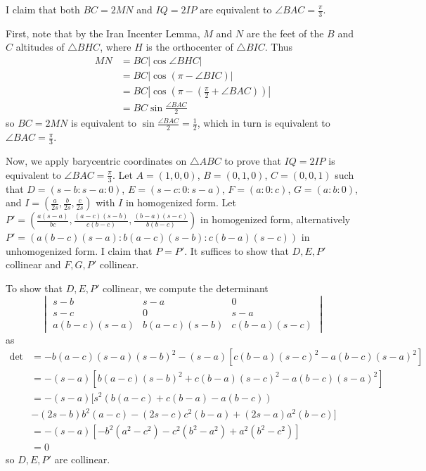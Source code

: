 I claim that both $BC=2MN$ and $IQ=2IP$ are equivalent to $\angle{BAC}=\frac{\pi}{3}$.

First, note that by the Iran Incenter Lemma, $M$ and $N$ are the feet of the $B$ and $C$ altitudes of $\triangle{BHC}$, where $H$ is the orthocenter of $\triangle{BIC}$. Thus
\begin{align*}
	MN&=BC\left|\cos\angle{BHC}\right|\\
	&=BC\left|\cos\left(\pi-\angle{BIC}\right)\right|\\
	&=BC\left|\cos\left(\pi-\left(\frac{\pi}{2}+\angle{BAC}\right)\right)\right|\\
	&=BC\sin\frac{\angle{BAC}}{2}
\end{align*}
so $BC=2MN$ is equivalent to $\sin\frac{\angle{BAC}}{2}=\frac{1}{2}$, which in turn is equivalent to $\angle{BAC}=\frac{\pi}{3}$.

Now, we apply barycentric coordinates on $\triangle{ABC}$ to prove that $IQ=2IP$ is equivalent to $\angle{BAC}=\frac{\pi}{3}$. Let $A=\left(1,0,0\right)$, $B=\left(0,1,0\right)$, $C=\left(0,0,1\right)$ such that $D=\left(s-b:s-a:0\right)$, $E=\left(s-c:0:s-a\right)$, $F=\left(a:0:c\right)$, $G=\left(a:b:0\right)$, and $I=\left(\frac{a}{2s},\frac{b}{2s},\frac{c}{2s}\right)$ with $I$ in homogenized form. Let $P'=\left(\frac{a\left(s-a\right)}{bc},\frac{\left(a-c\right)\left(s-b\right)}{c\left(b-c\right)},\frac{\left(b-a\right)\left(s-c\right)}{b\left(b-c\right)}\right)$ in homogenized form, alternatively $P'=\left(a\left(b-c\right)\left(s-a\right):b\left(a-c\right)\left(s-b\right):c\left(b-a\right)\left(s-c\right)\right)$ in unhomogenized form. I claim that $P=P'$. It suffices to show that $D,E,P'$ collinear and $F,G,P'$ collinear.

To show that $D,E,P'$ collinear, we compute the determinant \[
\begin{vmatrix}
	s-b & s-a & 0 \\
	s-c & 0 & s-a \\
	a\left(b-c\right)\left(s-a\right) & b\left(a-c\right)\left(s-b\right) & c\left(b-a\right)\left(s-c\right)
\end{vmatrix}
\] as
\begin{align*}
	\text{det}&=-b\left(a-c\right)\left(s-a\right)\left(s-b\right)^2-\left(s-a\right)\left[c\left(b-a\right)\left(s-c\right)^2-a\left(b-c\right)\left(s-a\right)^2\right]\\
	&=-\left(s-a\right)\left[b\left(a-c\right)\left(s-b\right)^2+c\left(b-a\right)\left(s-c\right)^2-a\left(b-c\right)\left(s-a\right)^2\right]\\
	&=-\left(s-a\right)\big[s^2\left(b\left(a-c\right)+c\left(b-a\right)-a\left(b-c\right)\right)\\&-\left(2s-b\right)b^2\left(a-c\right)-\left(2s-c\right)c^2\left(b-a\right)+\left(2s-a\right)a^2\left(b-c\right)\big]\\
	&=-\left(s-a\right)\left[-b^2\left(a^2-c^2\right)-c^2\left(b^2-a^2\right)+a^2\left(b^2-c^2\right)\right]\\
	&=0
\end{align*}
so $D,E,P'$ are collinear.

